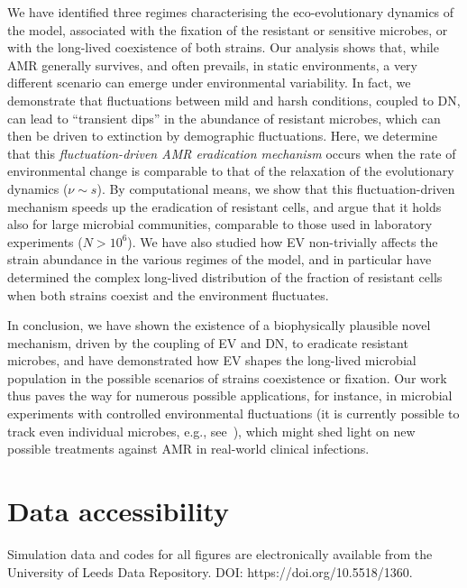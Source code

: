 \documentclass{article}
\begin{document}
We have identified three regimes characterising the eco-evolutionary dynamics of the model, associated with the fixation of the resistant or sensitive microbes, or with the long-lived coexistence of both strains. Our analysis shows that, while  AMR generally survives, and often prevails, in static environments, a very different scenario can emerge under environmental variability. In fact, we demonstrate that fluctuations between mild and harsh conditions, coupled to DN, can lead to ``transient dips'' in the abundance of resistant microbes, which can then be driven to extinction by demographic fluctuations. Here, we determine that this \emph{fluctuation-driven AMR eradication mechanism} occurs when the rate of environmental change is comparable to that of the relaxation of the evolutionary dynamics (\(\nu\sim s\)). By computational means, we show that this fluctuation-driven mechanism speeds up the eradication of resistant cells, and argue that it holds also for large microbial communities, comparable to those used in laboratory experiments (\(N>10^6\)). We have also studied how EV non-trivially affects the strain abundance in the various regimes of the model, and in particular have determined  the complex long-lived distribution of the fraction of resistant cells when both strains coexist and the environment fluctuates.

In conclusion, we have shown the existence of a biophysically plausible novel mechanism, driven by the coupling of EV and DN, to eradicate resistant microbes, and have demonstrated how EV shapes the long-lived microbial population in the possible scenarios of strains coexistence or fixation. Our work thus paves the way for numerous possible applications, for instance, in microbial experiments with controlled environmental fluctuations (it is currently possible to track even individual microbes, e.g., see~\cite{bakshi2021tracking, manuse2021bacterial}), which might shed light on new possible treatments against AMR in real-world clinical infections.

\vspace{1cm}

\section*{Data accessibility}
Simulation data and codes for all figures are electronically available from the University of Leeds Data Repository. DOI: https://doi.org/10.5518/1360.
\end{document}
